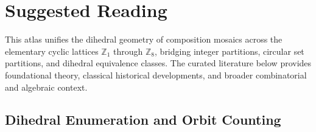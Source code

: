 \chapter*{Suggested Reading}

This atlas unifies the dihedral geometry of composition mosaics across the elementary cyclic lattices $\mathbb{Z}_1$ through $\mathbb{Z}_8$, bridging integer partitions, circular set partitions, and dihedral equivalence classes. The curated literature below provides foundational theory, classical historical developments, and broader combinatorial and algebraic context.

\section*{Dihedral Enumeration and Orbit Counting}

